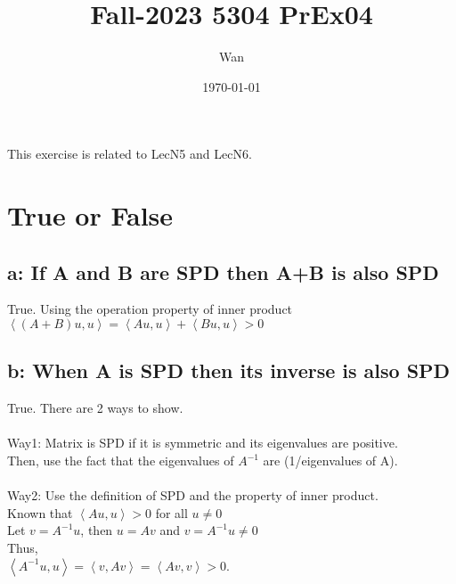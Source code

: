 \documentclass{article}
\begin{document}
\title{Fall-2023 5304 PrEx04}
\author{Wan}
\date{\today}
\maketitle

\noindent
This exercise is related to LecN5 and LecN6.

\section{True or False}
\subsection*{a: If A and B are SPD then A+B is also SPD}
True. Using the operation property of inner product\\
$\left\langle (A+B)u,u\right\rangle = 
\left\langle Au,u\right\rangle + \left\langle Bu,u\right\rangle > 0
$

\subsection*{b: When A is SPD then its inverse is also SPD}
True. There are 2 ways to show.\\
\\
Way1: Matrix is SPD if it is symmetric and its eigenvalues are positive.\\
Then, use the fact that the eigenvalues of $A^{-1}$ are (1/eigenvalues of A).\\
\\
Way2: Use the definition of SPD and the property of inner product.\\
Known that $\left\langle Au,u\right\rangle > 0$ for all $u \neq 0$\\
Let $v = A^{-1}u$, then $u = Av$ and $v = A^{-1}u \neq 0$\\
Thus,\\
$\left\langle A^{-1}u,u\right\rangle = \left\langle v,Av\right\rangle = \left\langle Av,v\right\rangle > 0$.\\
\end{document}
